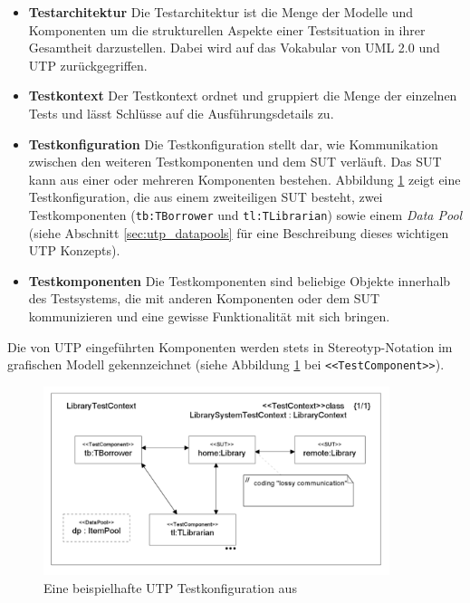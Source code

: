 \begin{itemize}
\item \textbf{Testarchitektur} Die Testarchitektur ist die Menge der Modelle und Komponenten um die strukturellen Aspekte einer Testsituation in ihrer Gesamtheit darzustellen. Dabei wird auf das Vokabular von \Gls{UML} 2.0 und \Gls{UTP} zurückgegriffen.
\item \textbf{Testkontext} Der Testkontext ordnet und gruppiert die Menge der einzelnen Tests und lässt Schlüsse auf die Ausführungsdetails zu.
\item \textbf{Testkonfiguration} Die Testkonfiguration stellt dar, wie Kommunikation zwischen den weiteren Testkomponenten und dem \Gls{SUT} verläuft. Das \Gls{SUT} kann aus einer oder mehreren Komponenten bestehen. Abbildung \ref{fig:utp_config} zeigt eine Testkonfiguration, die aus einem zweiteiligen \Gls{SUT} besteht, zwei Testkomponenten (\texttt{tb:TBorrower} und \texttt{tl:TLibrarian}) sowie einem \textit{Data Pool} (siehe Abschnitt \ref{sec:utp_datapools} für eine Beschreibung dieses wichtigen \Gls{UTP} Konzepts).
\item \textbf{Testkomponenten} Die Testkomponenten sind beliebige Objekte innerhalb des Testsystems, die mit anderen Komponenten oder dem \Gls{SUT} kommunizieren und eine gewisse Funktionalität mit sich bringen.
\end{itemize}

Die von \Gls{UTP} eingeführten Komponenten werden stets in Stereotyp-Notation im grafischen Modell gekennzeichnet (siehe Abbildung \ref{fig:utp_config} bei \texttt{<<TestComponent>>}).

\begin{figure}[h] 
  \centering
     \includegraphics[width=0.9\textwidth]{figures/utp_config.png}
  \caption{Eine beispielhafte UTP Testkonfiguration aus  \cite{_model-driven_2007}}
  \label{fig:utp_config}
\end{figure}

